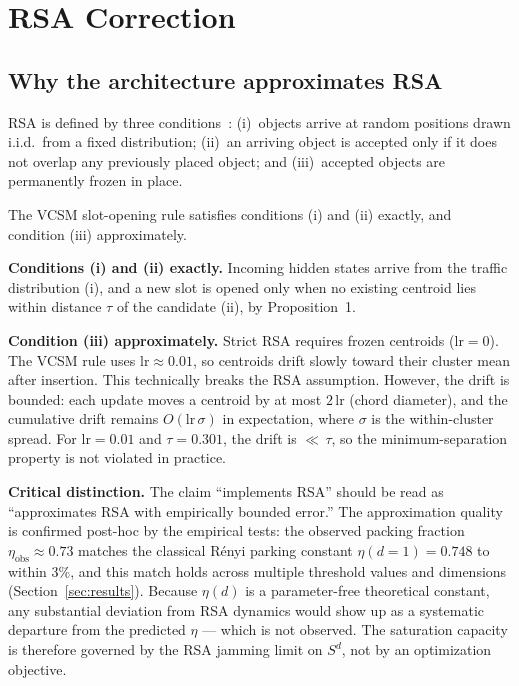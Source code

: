 \documentclass[11pt]{article}
\begin{document}
\section{RSA Correction}
\label{sec:rsa}

\subsection{Why the architecture approximates RSA}

RSA is defined by three conditions~\cite{renyi1958}: (i)~objects arrive at
random positions drawn i.i.d.\ from a fixed distribution;
(ii)~an arriving object is accepted only if it does not overlap any
previously placed object; and (iii)~accepted objects are permanently frozen
in place.

The VCSM slot-opening rule satisfies conditions (i) and (ii) exactly, and
condition (iii) approximately.

\textbf{Conditions (i) and (ii) exactly.}
Incoming hidden states arrive from the traffic distribution (i), and a new
slot is opened only when no existing centroid lies within distance $\tau$
of the candidate (ii), by Proposition~1.

\textbf{Condition (iii) approximately.}
Strict RSA requires frozen centroids ($\mathrm{lr} = 0$). The VCSM rule
uses $\mathrm{lr} \approx 0.01$, so centroids drift slowly toward their
cluster mean after insertion. This technically breaks the RSA assumption.
However, the drift is bounded: each update moves a centroid by at most
$2\,\mathrm{lr}$ (chord diameter), and the cumulative drift remains
$O(\mathrm{lr}\,\sigma)$ in expectation, where $\sigma$ is the within-cluster
spread. For $\mathrm{lr} = 0.01$ and $\tau = 0.301$, the drift is
${\ll}\,\tau$, so the minimum-separation property is not violated in practice.

\textbf{Critical distinction.}
The claim ``implements RSA'' should be read as ``approximates RSA with
empirically bounded error.'' The approximation quality is confirmed
post-hoc by the empirical tests: the observed packing fraction
$\eta_{\text{obs}} \approx 0.73$ matches the classical Rényi parking
constant $\eta(d=1) = 0.748$ to within 3\%, and this match holds across
multiple threshold values and dimensions (Section~\ref{sec:results}).
Because $\eta(d)$ is a parameter-free theoretical constant, any
substantial deviation from RSA dynamics would show up as a systematic
departure from the predicted $\eta$ --- which is not observed.
The saturation capacity is therefore governed by the RSA jamming limit on
$S^d$, not by an optimization objective.
\end{document}

